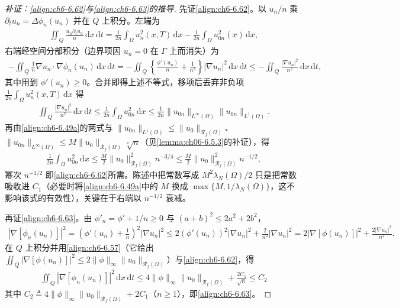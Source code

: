 \documentclass[../../main.tex]{subfiles}%
\begin{document}
\begin{proof}[补证：\eqref{align:ch6-6.62}与\eqref{align:ch6-6.63}的推导]
先证\eqref{align:ch6-6.62}。以 $u_n/n$ 乘 $\partial_tu_n=\Delta\phi_n(u_n)$ 并在 $Q$ 上积分。左端为
\begin{align*}
\iint_Q\frac{u_n\partial_tu_n}{n}\,\mathrm{d}x\,\mathrm{d}t
=\frac{1}{2n}\int_\Omega u_n^2(x,T)\,\mathrm{d}x-\frac{1}{2n}\int_\Omega u_{0n}^2(x)\,\mathrm{d}x,
\end{align*}
右端经空间分部积分（边界项因 $u_n=0$ 在 $\Gamma$ 上而消失）为
\begin{align*}
-\iint_Q\frac{1}{n}\nabla u_n\cdot\nabla\phi_n(u_n)\,\mathrm{d}x\,\mathrm{d}t
=-\iint_Q\left\{\frac{\phi'(u_n)}{n}+\frac{1}{n^2}\right\}|\nabla u_n|^2\,\mathrm{d}x\,\mathrm{d}t
\leqslant-\iint_Q\frac{|\nabla u_n|^2}{n^2}\,\mathrm{d}x\,\mathrm{d}t,
\end{align*}
其中用到 $\phi'(u_n)\geqslant0$。合并即得上述不等式，移项后丢弃非负项 $\frac{1}{2n}\int_\Omega u_n^2(x,T)\,\mathrm{d}x$ 得
\begin{align*}
\iint_Q\frac{|\nabla u_n|^2}{n^2}\,\mathrm{d}x\,\mathrm{d}t\leqslant\frac{1}{2n}\int_\Omega u_{0n}^2\,\mathrm{d}x
\leqslant\frac{1}{2n}\|u_{0n}\|_{L^\infty(\Omega)}\|u_{0n}\|_{L^1(\Omega)}.
\end{align*}
再由\eqref{align:ch6-6.49a}的两式与 $\|u_{0n}\|_{L^1(\Omega)}\leqslant\|u_0\|_{\mathscr{R}_f(\Omega)}$、$\|u_{0n}\|_{L^\infty(\Omega)}\leqslant M\|u_0\|_{\mathscr{R}_f(\Omega)}\sqrt[4]{n}$（见\cref{lemma:ch06-6.5.3}的补证），得
\begin{align*}
\frac{1}{2n}\int_\Omega u_{0n}^2\,\mathrm{d}x
\leqslant\frac{M}{2}\|u_0\|^2_{\mathscr{R}_f(\Omega)}n^{-3/4}
\leqslant\frac{M}{2}\|u_0\|^2_{\mathscr{R}_f(\Omega)}n^{-1/2},
\end{align*}
幂次 $n^{-1/2}$ 即\eqref{align:ch6-6.62}所需。陈述中把常数写成 $M^2\lambda_N(\Omega)/2$ 只是把常数吸收进 $C_1$（必要时将\eqref{align:ch6-6.49a}中的 $M$ 换成 $\max\{M,1/\lambda_N(\Omega)\}$，这不影响该式的有效性），关键在于右端以 $n^{-1/2}$ 衰减。

再证\eqref{align:ch6-6.63}。由 $\phi'_n=\phi'+1/n\geqslant0$ 与 $(a+b)^2\leqslant2a^2+2b^2$，
\begin{align*}
|\nabla[\phi_n(u_n)]|^2=\left(\phi'(u_n)+\frac{1}{n}\right)^2|\nabla u_n|^2
\leqslant2(\phi'(u_n))^2|\nabla u_n|^2+\frac{2}{n^2}|\nabla u_n|^2
=2|\nabla[\phi(u_n)]|^2+\frac{2|\nabla u_n|^2}{n^2}.
\end{align*}
在 $Q$ 上积分并用\eqref{align:ch6-6.57}（它给出 $\iint_Q|\nabla[\phi(u_n)]|^2\leqslant2\|\phi\|_\infty\|u_0\|_{\mathscr{R}_f(\Omega)}$）与\eqref{align:ch6-6.62}，得
\begin{align*}
\iint_Q|\nabla[\phi_n(u_n)]|^2\,\mathrm{d}x\,\mathrm{d}t
\leqslant4\|\phi\|_\infty\|u_0\|_{\mathscr{R}_f(\Omega)}+\frac{2C_1}{\sqrt{n}}
\leqslant C_2
\end{align*}
其中 $C_2\triangleq4\|\phi\|_\infty\|u_0\|_{\mathscr{R}_f(\Omega)}+2C_1$（$n\geqslant1$），即\eqref{align:ch6-6.63}。
\end{proof}
\end{document}
